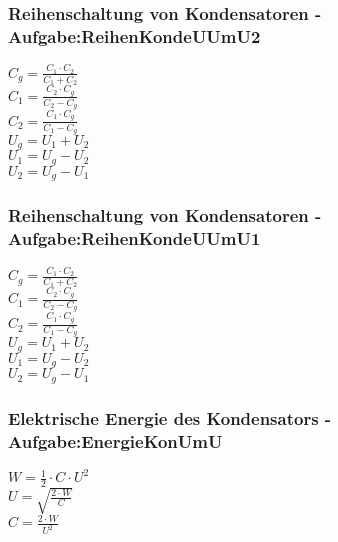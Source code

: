 \subsubsection{Reihenschaltung von Kondensatoren - Aufgabe:ReihenKondeUUmU2} 
\begin{minipage}{0.45\textwidth} 
$ C_{g}  = \frac{C_{1} \cdot C_{2} }{C_{1} +C_{2} } $\\ 
$ C_{1}  = \frac{C_{2} \cdot C_{g} }{C_{2} -C_{g} } $\\ 
$ C_{2}  = \frac{C_{1} \cdot C_{g} }{C_{1} -C_{g} } $\\ 
$ U_{g}  = U_{1}  + U_{2} $\\ 
$ U_{1}  = U_{g}  - U_{2} $\\ 
$ U_{2}  = U_{g}  - U_{1} $\\ 
\end{minipage} 
\begin{minipage}{0.45\textwidth} 
 
\end{minipage} 
\subsubsection{Reihenschaltung von Kondensatoren - Aufgabe:ReihenKondeUUmU1} 
\begin{minipage}{0.45\textwidth} 
$ C_{g}  = \frac{C_{1} \cdot C_{2} }{C_{1} +C_{2} } $\\ 
$ C_{1}  = \frac{C_{2} \cdot C_{g} }{C_{2} -C_{g} } $\\ 
$ C_{2}  = \frac{C_{1} \cdot C_{g} }{C_{1} -C_{g} } $\\ 
$ U_{g}  = U_{1}  + U_{2} $\\ 
$ U_{1}  = U_{g}  - U_{2} $\\ 
$ U_{2}  = U_{g}  - U_{1} $\\ 
\end{minipage} 
\begin{minipage}{0.45\textwidth} 
 
\end{minipage} 
\subsubsection{Elektrische Energie des Kondensators - Aufgabe:EnergieKonUmU} 
\begin{minipage}{0.45\textwidth} 
$ W =\frac{1}{2}\cdot C\cdot U^{2} $\\ 
$ U = \sqrt{\frac{2\cdot W}{ C}} $\\ 
$ C = \frac{2\cdot W}{ U^{2} } $\\ 
\end{minipage} 
\begin{minipage}{0.45\textwidth} 
 
\end{minipage} 
